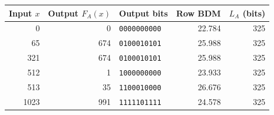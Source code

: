 \begin{tabular}{rrlrr}
\toprule
Input $x$ & Output $F_A(x)$ & Output bits & Row BDM & $L_A$ (bits) \\
\midrule
0 & 0 & \texttt{0000000000} & 22.784 & 325 \\
65 & 674 & \texttt{0100010101} & 25.988 & 325 \\
321 & 674 & \texttt{0100010101} & 25.988 & 325 \\
512 & 1 & \texttt{1000000000} & 23.933 & 325 \\
513 & 35 & \texttt{1100010000} & 26.676 & 325 \\
1023 & 991 & \texttt{1111101111} & 24.578 & 325 \\
\bottomrule
\end{tabular}
